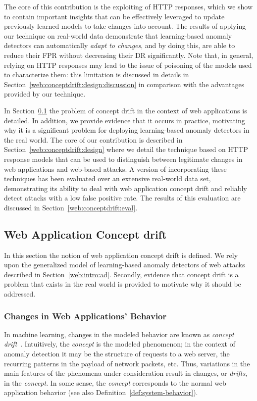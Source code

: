 The core of this contribution is the exploiting of
\ac{HTTP} responses, which we show to contain important
insights that can be effectively leveraged to update previously
learned models to take changes into account. The results of applying
our technique on real-world data demonstrate that learning-based
anomaly detectors can automatically \emph{adapt to changes}, and by
doing this, are able to reduce their \ac{FPR} without decreasing their
\ac{DR} significantly. Note that, in general, relying on HTTP
responses may lead to the issue of poisoning of the models used to
characterize them: this limitation is discussed in details in
Section~\ref{web:conceptdrift:design:discussion} in comparison with
the advantages provided by our technique.

In Section~\ref{web:conceptdrift:motivation} the problem of concept
drift in the context of web applications is detailed. In addition, we
provide evidence that it occurs in practice, motivating why it is a
significant problem for deploying learning-based anomaly detectors in
the real world. The core of our contribution is described in
Section~\ref{web:conceptdrift:design} where we detail the technique
based on \ac{HTTP} response models that can be used to
distinguish between legitimate changes in web applications and
web-based attacks. A version of \webanomaly incorporating these
techniques has been evaluated over an extensive real-world data set,
demonstrating its ability to deal with web application concept drift
and reliably detect attacks with a low false positive rate. The
results of this evaluation are discussed in
Section~\ref{web:conceptdrift:eval}.

\subsection{Web Application Concept drift}
\label{web:conceptdrift:motivation}
In this section the notion of web application concept drift is defined. We rely upon the generalized model of learning-based anomaly detectors of web attacks described in Section~\ref{web:intro:ad}. Secondly, evidence that concept drift is a problem that exists in the real world is provided to motivate why it should be addressed.

\subsubsection{Changes in Web Applications' Behavior}
\label{web:conceptdrift:motivation:dynamic}
In machine learning, changes in the modeled behavior are known as \emph{concept drift}~\citep{concept-drift:conference}. Intuitively, the \emph{concept} is the modeled phenomenon; in the context of anomaly detection it may be the structure of requests to a web server, the recurring patterns in the payload of network packets, etc. Thus, variations in the main features of the phenomena under consideration result in changes, or \emph{drifts}, in the \emph{concept}. In some sense, the \emph{concept} corresponds to the normal web application behavior (see also Definition~\ref{def:system-behavior}).

